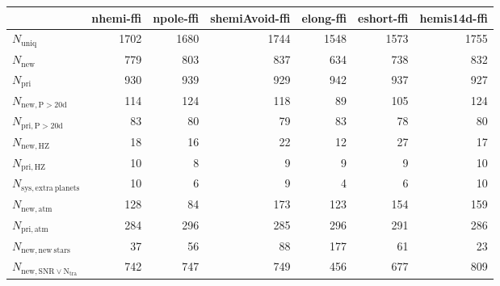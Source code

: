 \begin{tabular}{lrrrrrr}
\toprule
{} &  nhemi-ffi &  npole-ffi &  shemiAvoid-ffi &  elong-ffi &  eshort-ffi &  hemis14d-ffi \\
\midrule
$N_{\mathrm{uniq}}$                &       1702 &       1680 &            1744 &       1548 &        1573 &          1755 \\
$N_{\mathrm{new}}$                 &        779 &        803 &             837 &        634 &         738 &           832 \\
$N_{\mathrm{pri}}$                 &        930 &        939 &             929 &        942 &         937 &           927 \\
$N_{\mathrm{new,P>20d}}$           &        114 &        124 &             118 &         89 &         105 &           124 \\
$N_{\mathrm{pri,P>20d}}$           &         83 &         80 &              79 &         83 &          78 &            80 \\
$N_{\mathrm{new,HZ}}$              &         18 &         16 &              22 &         12 &          27 &            17 \\
$N_{\mathrm{pri,HZ}}$              &         10 &          8 &               9 &          9 &           9 &            10 \\
$N_{\mathrm{sys,extra\ planets}}$  &         10 &          6 &               9 &          4 &           6 &            10 \\
$N_{\mathrm{new,atm}}$             &        128 &         84 &             173 &        123 &         154 &           159 \\
$N_{\mathrm{pri,atm}}$             &        284 &        296 &             285 &        296 &         291 &           286 \\
$N_{\mathrm{new,new\ stars}}$      &         37 &         56 &              88 &        177 &          61 &            23 \\
$N_{\mathrm{new,SNR\lor N_{tra}}}$ &        742 &        747 &             749 &        456 &         677 &           809 \\
\bottomrule
\end{tabular}
